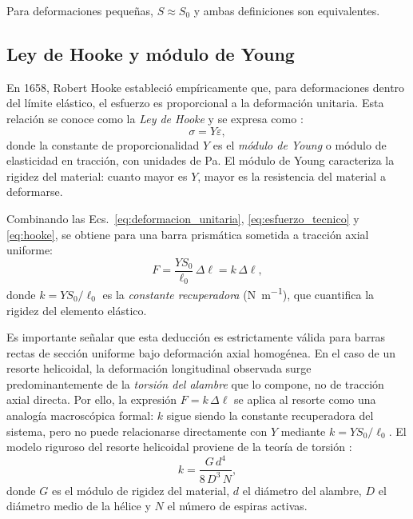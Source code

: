 Para deformaciones pequeñas, $S \approx S_0$ y ambas definiciones son equivalentes.

\subsection{Ley de Hooke y módulo de Young}

En 1658, Robert Hooke estableció empíricamente que, para deformaciones dentro del límite
elástico, el esfuerzo es proporcional a la deformación unitaria. Esta relación se conoce
como la \textit{Ley de Hooke} y se expresa como \cite{serway}:
\begin{equation}
    \sigma = Y\varepsilon,
    \label{eq:hooke}
\end{equation}
donde la constante de proporcionalidad $Y$ es el \textit{módulo de Young} o módulo de
elasticidad en tracción, con unidades de \unit{\pascal}. El módulo de Young caracteriza
la rigidez del material: cuanto mayor es $Y$, mayor es la resistencia del material a
deformarse.

Combinando las Ecs.~\eqref{eq:deformacion_unitaria}, \eqref{eq:esfuerzo_tecnico} y
\eqref{eq:hooke}, se obtiene para una barra prismática sometida a tracción axial uniforme:
\begin{equation}
    F = \frac{Y S_0}{\ell_0}\,\Delta\ell = k\,\Delta\ell,
    \label{eq:hooke_resorte}
\end{equation}
donde $k = Y S_0 / \ell_0$ es la \textit{constante recuperadora}
(\unit{\newton\per\metre}), que cuantifica la rigidez del elemento elástico.

Es importante señalar que esta deducción es estrictamente válida para barras rectas de
sección uniforme bajo deformación axial homogénea. En el caso de un resorte helicoidal,
la deformación longitudinal observada surge predominantemente de la \textit{torsión del
alambre} que lo compone, no de tracción axial directa. Por ello, la expresión
$F = k\,\Delta\ell$ se aplica al resorte como una analogía macroscópica formal: $k$
sigue siendo la constante recuperadora del sistema, pero no puede relacionarse
directamente con $Y$ mediante $k = Y S_0/\ell_0$. El modelo riguroso del resorte
helicoidal proviene de la teoría de torsión \cite{halliday}:
\begin{equation}
    k = \frac{G\,d^4}{8\,D^3\,N},
    \label{eq:k_resorte_helico}
\end{equation}
donde $G$ es el módulo de rigidez del material, $d$ el diámetro del alambre, $D$ el
diámetro medio de la hélice y $N$ el número de espiras activas.

